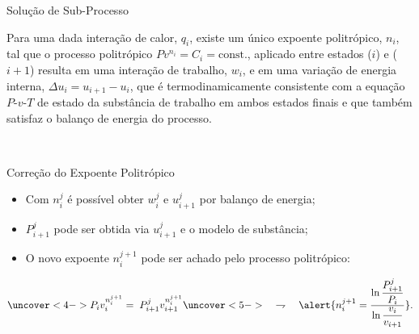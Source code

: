     \begin{frame}{Solução de Sub-Processo}\vspace*{-2em}
        \begin{cnj}
            Para  uma  dada  interação  de  calor,  $q_i$,  existe  um   \alert{único   expoente
            politrópico,  $n_i$},  tal  que  o  processo   politrópico   $Pv^{n_i}   =   C_i   =
            \mathrm{const.}$, aplicado entre estados ($i$) e ($i+1$) resulta em uma interação de
            trabalho, $w_i$, e em uma variação de energia interna, $\Delta u_i = u_{i+1} - u_i$,
            que é \alert{termodinamicamente consistente} com  a  \alert{equação  $P$-$v$-$T$  de
            estado} da substância de trabalho em ambos estados finais e que  também  satisfaz  o
            \alert{balanço de energia} do processo.
        \end{cnj}
        \vspace*{\smallskipamount}\\
        \vspace*{\smallskipamount}
    \end{frame}

    \begin{frame}{Correção do Expoente Politrópico}\vspace*{-2em}
        \begin{itemize}
            \item<1-> Com $n_i^j$ é possível obter $w_i^j$ e $u_{i+1}^j$ por  \alert{balanço  de
                energia};
            \item<2->  $P_{i+1}^j$  pode  ser  obtida  via  $u_{i+1}^j$  e  o  \alert{modelo  de
                substância};
            \item<3->  O  novo  expoente  $n_i^{j+1}$  pode  ser  achado  pelo   \alert{processo
                politrópico}:\\[\bigskipamount]
        \end{itemize}
        \begin{equation}
            \uncover<4->{
                P_iv_i^{n_i^{j+1}} = \;P_{i+1}^jv_{i+1}^{n_i^{j+1}}
            }
            \uncover<5->{
                \quad\rightharpoondown\quad\alert{
                n_i^{j+1} = \dfrac{
                        \ln\dfrac{P_{i+1}^j}{P_i}
                    }{
                        \ln\dfrac{v_i}{v_{i+1}}
                    }
                }.\nonumber
            }
        \end{equation}
    \end{frame}

